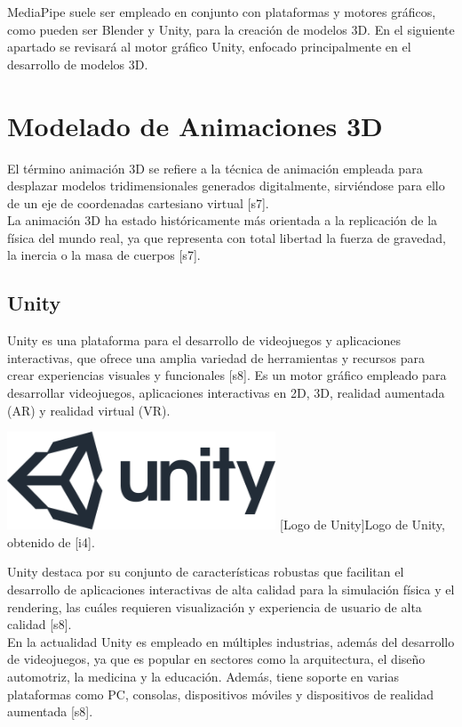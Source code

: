 MediaPipe suele ser empleado en conjunto con plataformas y motores gráficos, como pueden ser Blender y Unity, para la creación de modelos 3D. En el siguiente apartado se revisará al motor gráfico Unity, enfocado principalmente en el desarrollo de modelos 3D.

\section{Modelado de Animaciones 3D}
El término animación 3D se refiere a la técnica de animación empleada para desplazar modelos tridimensionales generados digitalmente, sirviéndose para ello de un eje de coordenadas cartesiano virtual [s7].\\

La animación 3D ha estado históricamente más orientada a la replicación de la física del mundo real, ya que representa con total libertad la fuerza de gravedad, la inercia o la masa de cuerpos [s7].

\subsection{Unity}
Unity es una plataforma para el desarrollo de videojuegos y aplicaciones interactivas, que ofrece una amplia variedad de herramientas y recursos para crear experiencias visuales y funcionales [s8]. Es un motor gráfico empleado para desarrollar videojuegos, aplicaciones interactivas en 2D, 3D, realidad aumentada (AR) y realidad virtual (VR).\\

\begin{center}
    \includegraphics[width=0.6\textwidth]{Images/Cap 2/Unity_Logo.png}
    [Logo de Unity]{Logo de Unity, obtenido de [i4].} 
\end{center}

Unity destaca por su conjunto de características robustas que facilitan el desarrollo de aplicaciones interactivas de alta calidad para la simulación física y el rendering, las cuáles requieren visualización y experiencia de usuario de alta calidad [s8].\\

En la actualidad Unity es empleado en múltiples industrias, además del desarrollo de videojuegos, ya que es popular en sectores como la arquitectura, el diseño automotriz, la medicina y la educación. Además, tiene soporte en varias plataformas como PC, consolas, dispositivos móviles y dispositivos de realidad aumentada [s8].\\

